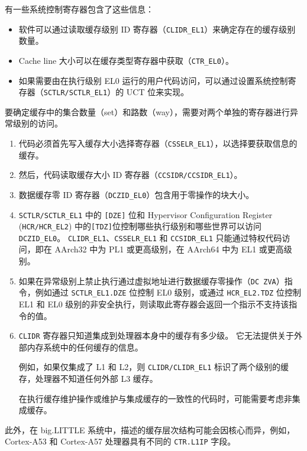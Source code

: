 有一些系统控制寄存器包含了这些信息：

\begin{itemize}
  \item 软件可以通过读取缓存级别 ID 寄存器（\lstinline!CLIDR_EL1!）来确定存在的缓存级别数量。
  \item Cache line 大小可以在缓存类型寄存器中获取（\lstinline!CTR_EL0!）。
  \item 如果需要由在执行级别 EL0 运行的用户代码访问，可以通过设置系统控制寄存器（\lstinline!SCTLR/SCTLR_EL1!）的 UCT 位来实现。
\end{itemize}

要确定缓存中的集合数量（set）和路数（way），需要对两个单独的寄存器进行异常级别的访问。

\begin{enumerate}
  \item 代码必须首先写入缓存大小选择寄存器（\lstinline!CSSELR_EL1!），以选择要获取信息的缓存。
  \item 然后，代码读取缓存大小 ID 寄存器（\lstinline!CCSIDR/CCSIDR_EL1!）。
  \item 数据缓存零 ID 寄存器（\lstinline!DCZID_EL0!）包含用于零操作的块大小。
  \item \lstinline!SCTLR/SCTLR_EL1! 中的 \lstinline![DZE]! 位和 Hypervisor Configuration Register (\lstinline!HCR/HCR_EL2!) 中的\lstinline![TDZ]!位控制哪些执行级别和哪些世界可以访问 \lstinline!DCZID_EL0!。
    \lstinline!CLIDR_EL1!、\lstinline!CSSELR_EL1! 和 \lstinline!CCSIDR_EL1! 只能通过特权代码访问，即在 AArch32 中为 PL1 或更高级别，在 AArch64 中为 EL1 或更高级别。
  \item 如果在异常级别上禁止执行通过虚拟地址进行数据缓存零操作（\lstinline!DC ZVA!）指令，例如通过 \lstinline!SCTLR_EL1.DZE! 位控制 EL0 级别，或通过 \lstinline!HCR_EL2.TDZ! 位控制 EL1 和 EL0 级别的非安全执行，则读取此寄存器会返回一个指示不支持该指令的值。

  \item \lstinline!CLIDR! 寄存器只知道集成到处理器本身中的缓存有多少级。
  它无法提供关于外部内存系统中的任何缓存的信息。

    例如，如果仅集成了 L1 和 L2，则 \lstinline!CLIDR/CLIDR_EL1! 标识了两个级别的缓存，处理器不知道任何外部 L3 缓存。

    在执行缓存维护操作或维护与集成缓存的一致性的代码时，可能需要考虑非集成缓存。
\end{enumerate}


此外，在 big.LITTLE 系统中，描述的缓存层次结构可能会因核心而异，例如，Cortex-A53 和 Cortex-A57 处理器具有不同的 \lstinline!CTR.L1IP! 字段。
